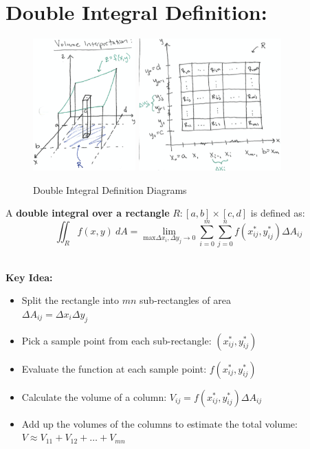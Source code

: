 \section*{Double Integral Definition:}





\begin{figure}[!hbtp]
\includegraphics[height=2in]{Ch12s1-Volume1.png}
\hspace*{1in}
\includegraphics[height=2in]{Ch12s1-Rectangle1.png}
\caption{Double Integral Definition Diagrams}
\end{figure}



A  \textbf{double integral over a rectangle} \(R:[a,b] \times [c,d]\) is defined as:
\[
\iint_R f(x,y)\ dA = \lim_{\text{max} \Delta x_i, \Delta y_j \rightarrow 0}
 \sum_{i=0}^m \sum_{j=0}^n f\left( x_{ij}^*, y_{ij}^* \right) \Delta A_{ij}
\]

~\\
\textbf{Key Idea:}\\
\begin{itemize}
\item Split the rectangle into \(mn\) sub-rectangles of area\\ \(\Delta A_{ij} = \Delta x_i \Delta y_j\)
\item Pick a sample point from each sub-rectangle: \(\left( x_{ij}^*, y_{ij}^* \right) \)
\item Evaluate the function at each sample point: \(f\left( x_{ij}^*, y_{ij}^* \right)\)
\item Calculate the volume of a column: \(V_{ij} =  f\left( x_{ij}^*, y_{ij}^* \right) \Delta A_{ij}\)
\item Add up the volumes of the columns to estimate the total volume: \(V \approx V_{11} + V_{12} + \ldots + V_{mn}\) 
\end{itemize}


